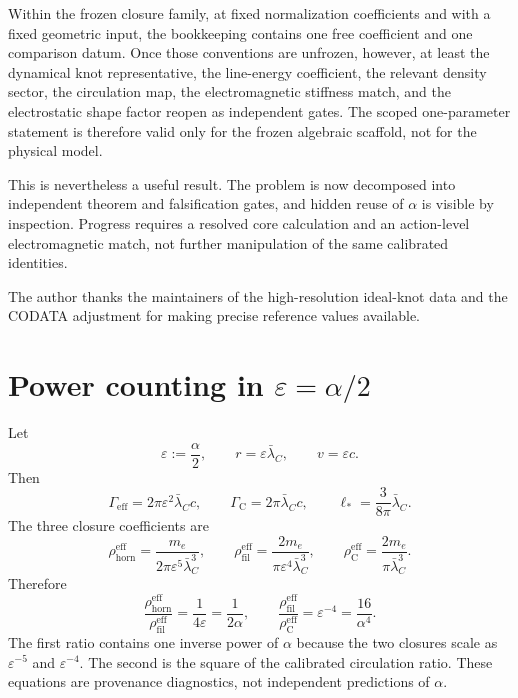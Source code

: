 \documentclass[aps,pre,preprint,notitlepage,nofootinbib,superscriptaddress]{revtex4-2}
\newcommand{\lC}{\bar\lambda_C}
\newcommand{\rhohorn}{\rho_{\mathrm{horn}}^{\mathrm{eff}}}
\newcommand{\rhofil}{\rho_{\mathrm{fil}}^{\mathrm{eff}}}
\newcommand{\rhoCeff}{\rho_{\mathrm C}^{\mathrm{eff}}}
\newcommand{\Gammaeff}{\Gamma_{\mathrm{eff}}}
\newcommand{\GammaC}{\Gamma_{\mathrm C}}
\begin{document}
Within the frozen closure family, at fixed normalization coefficients and with a fixed geometric input, the bookkeeping contains one free coefficient and one comparison datum.  Once those conventions are unfrozen, however, at least the dynamical knot representative, the line-energy coefficient, the relevant density sector, the circulation map, the electromagnetic stiffness match, and the electrostatic shape factor reopen as independent gates.  The scoped one-parameter statement is therefore valid only for the frozen algebraic scaffold, not for the physical model.

This is nevertheless a useful result.  The problem is now decomposed into independent theorem and falsification gates, and hidden reuse of \(\alpha\) is visible by inspection.  Progress requires a resolved core calculation and an action-level electromagnetic match, not further manipulation of the same calibrated identities.

\begin{acknowledgments}
The author thanks the maintainers of the high-resolution ideal-knot data and the CODATA adjustment for making precise reference values available.
\end{acknowledgments}

\appendix

\section{Power counting in \texorpdfstring{\(\varepsilon=\alpha/2\)}{epsilon}}
\label{app:powers}

Let
\[
\varepsilon:=\frac{\alpha}{2},
\qquad
r=\varepsilon\lC,
\qquad
v=\varepsilon c.
\]
Then
\begin{equation}
  \Gammaeff
  =
  2\pi\varepsilon^2\lC c,
  \qquad
  \GammaC
  =
  2\pi\lC c,
  \qquad
  \ell_*=\frac{3}{8\pi}\lC.
\end{equation}
The three closure coefficients are
\begin{equation}
  \rhohorn
  =
  \frac{m_e}{2\pi\varepsilon^5\lC^3},
  \qquad
  \rhofil
  =
  \frac{2m_e}{\pi\varepsilon^4\lC^3},
  \qquad
  \rhoCeff
  =
  \frac{2m_e}{\pi\lC^3}.
\end{equation}
Therefore
\begin{equation}
  \frac{\rhohorn}{\rhofil}
  =
  \frac{1}{4\varepsilon}
  =
  \frac{1}{2\alpha},
  \qquad
  \frac{\rhofil}{\rhoCeff}
  =
  \varepsilon^{-4}
  =
  \frac{16}{\alpha^4}.
\end{equation}
The first ratio contains one inverse power of \(\alpha\) because the two closures scale as \(\varepsilon^{-5}\) and \(\varepsilon^{-4}\).  The second is the square of the calibrated circulation ratio.  These equations are provenance diagnostics, not independent predictions of \(\alpha\).
\end{document}
